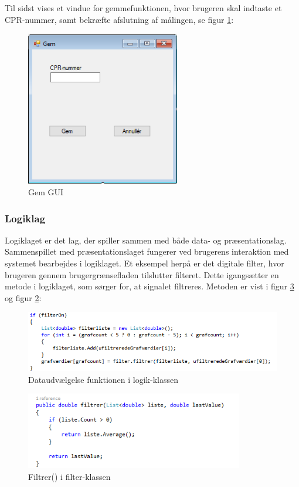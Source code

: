 Til sidst vises et vindue for gemmefunktionen, hvor brugeren skal indtaste et CPR-nummer, samt bekræfte afslutning af målingen, se figur \ref{Gem}:

\begin{figure}[H]
	\centering
	\includegraphics[width=0.6\textwidth]{Figurer/SoftwareImplementering/Gem}
	\caption{Gem GUI}
	\label{Gem}
\end{figure}

\subsubsection{Logiklag}\label{Logiklag}
Logiklaget er det lag, der spiller sammen med både data- og præsentationslag. Sammenspillet med præsentationslaget fungerer ved brugerens interaktion med systemet bearbejdes i logiklaget. Et eksempel herpå er det digitale filter, hvor brugeren gennem brugergrænsefladen tilslutter filteret. Dette igangsætter en metode i logiklaget, som sørger for, at signalet filtreres. Metoden er vist i figur \ref{filtrer} og figur \ref{Filtrer}:

\begin{figure}[H]
	\centering
	\includegraphics[width=1.15\textwidth]{Figurer/SoftwareImplementering/Filtrer1}
	\caption{Dataudvælgelse funktionen i logik-klassen}
	\label{Filtrer}
\end{figure}

\begin{figure}[H]
	\centering
	\includegraphics[width=0.85\textwidth]{Figurer/SoftwareImplementering/filtrer}
	\caption{Filtrer() i filter-klassen}
	\label{filtrer}
\end{figure}


